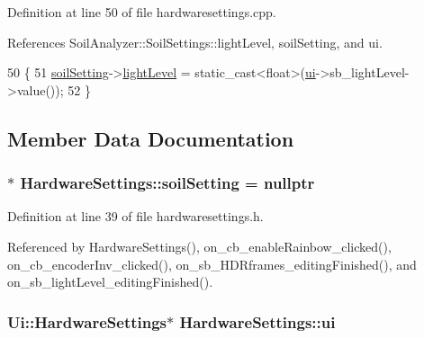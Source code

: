 Definition at line 50 of file hardwaresettings.\+cpp.



References Soil\+Analyzer\+::\+Soil\+Settings\+::light\+Level, soil\+Setting, and ui.


\begin{DoxyCode}
50                                                         \{
51   \hyperlink{class_hardware_settings_a01cb694c4dbf49199d239a890639dce6}{soilSetting}->\hyperlink{class_soil_analyzer_1_1_soil_settings_aa4d3ed8c1ab6551bfa4763e8a1ffc148}{lightLevel} = \textcolor{keyword}{static\_cast<}\textcolor{keywordtype}{float}\textcolor{keyword}{>}(\hyperlink{class_hardware_settings_ae46cc8fe1f4247ab95bedf9bd5c14557}{ui}->sb\_lightLevel->value());
52 \}
\end{DoxyCode}


\subsection{Member Data Documentation}
\hypertarget{class_hardware_settings_a01cb694c4dbf49199d239a890639dce6}{}
\subsubsection[{soil\+Setting}]{$\ast$ Hardware\+Settings\+::soil\+Setting = nullptr\hspace{0.3cm}{\ttfamily [private]}}\label{class_hardware_settings_a01cb694c4dbf49199d239a890639dce6}


Definition at line 39 of file hardwaresettings.\+h.



Referenced by Hardware\+Settings(), on\+\_\+cb\+\_\+enable\+Rainbow\+\_\+clicked(), on\+\_\+cb\+\_\+encoder\+Inv\+\_\+clicked(), on\+\_\+sb\+\_\+\+H\+D\+Rframes\+\_\+editing\+Finished(), and on\+\_\+sb\+\_\+light\+Level\+\_\+editing\+Finished().

\hypertarget{class_hardware_settings_ae46cc8fe1f4247ab95bedf9bd5c14557}{}
\subsubsection[{ui}]{\setlength{\rightskip}{0pt plus 5cm}Ui\+::\+Hardware\+Settings$\ast$ Hardware\+Settings\+::ui\hspace{0.3cm}{\ttfamily [private]}}\label{class_hardware_settings_ae46cc8fe1f4247ab95bedf9bd5c14557}


